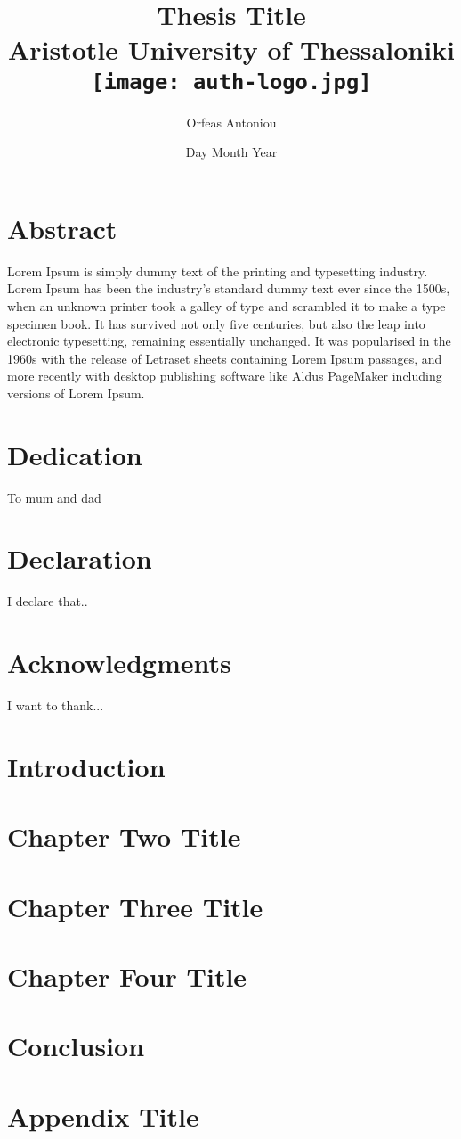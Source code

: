 \documentclass[12pt]{report}
\title{
	{Thesis Title}\\
	{\large Aristotle University of Thessaloniki}\\
	{\texttt{[image: auth-logo.jpg]}}
}
\author{Orfeas Antoniou}
\date{Day Month Year}
\begin{document}
\maketitle
\chapter*{Abstract}
Lorem Ipsum is simply dummy text of the printing and typesetting industry. Lorem Ipsum has been the industry's standard dummy text ever since the 1500s, when an unknown printer took a galley of type and scrambled it to make a type specimen book. It has survived not only five centuries, but also the leap into electronic typesetting, remaining essentially unchanged. It was popularised in the 1960s with the release of Letraset sheets containing Lorem Ipsum passages, and more recently with desktop publishing software like Aldus PageMaker including versions of Lorem Ipsum.

\chapter*{Dedication}
To mum and dad

\chapter*{Declaration}
I declare that..

\chapter*{Acknowledgments}
I want to thank...

\tableofcontents

\chapter{Introduction}


\chapter{Chapter Two Title}


\chapter{Chapter Three Title}


\chapter{Chapter Four Title}


\chapter{Conclusion}


\appendix
\chapter{Appendix Title}

\end{document}
